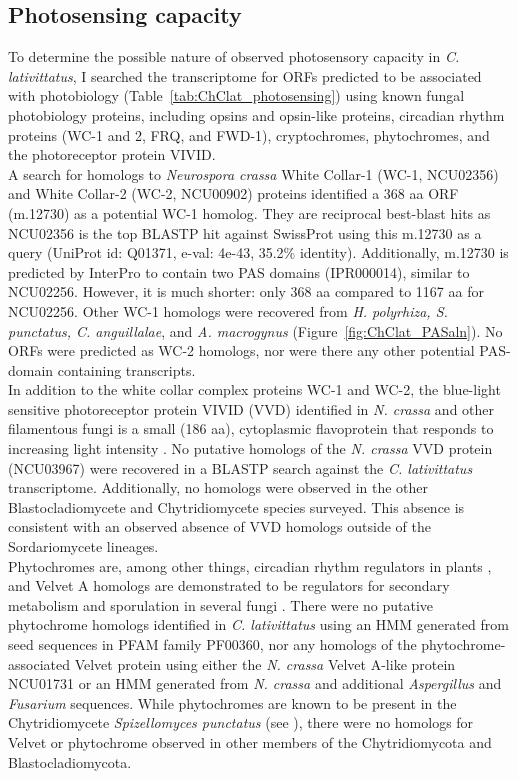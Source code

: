 \subsection*{Photosensing capacity}
To determine the possible nature of observed photosensory capacity in \textit{C. lativittatus}, I searched the transcriptome for ORFs predicted to be associated with photobiology (Table~\ref{tab:ChClat_photosensing}) using known fungal photobiology proteins, including opsins and opsin-like proteins, circadian rhythm proteins (WC-1 and 2, FRQ, and FWD-1), cryptochromes, phytochromes, and the photoreceptor protein VIVID. \\
\indent A search for homologs to \textit{Neurospora crassa} White Collar-1 (WC-1, NCU02356) and White Collar-2 (WC-2, NCU00902) proteins identified a 368 aa ORF (m.12730) as a potential WC-1 homolog. They are reciprocal best-blast hits as NCU02356 is the top BLASTP hit against SwissProt using this m.12730 as a query (UniProt id: Q01371, e-val: 4e-43, 35.2\% identity). Additionally, m.12730 is predicted by InterPro to contain two PAS domains (IPR000014), similar to NCU02256. However, it is much shorter: only 368 aa compared to 1167 aa for NCU02256. Other WC-1 homologs were recovered from \textit{H. polyrhiza, S. punctatus, C. anguillalae}, and \textit{A. macrogynus} (Figure~\ref{fig:ChClat_PASaln}). No ORFs were predicted as WC-2 homologs, nor were there any other potential PAS-domain containing transcripts. \\
\indent In addition to the white collar complex proteins WC-1 and WC-2, the blue-light sensitive photoreceptor protein VIVID (VVD) identified in \textit{N. crassa} and other filamentous fungi is a small (186 aa), cytoplasmic flavoprotein that responds to increasing light intensity \cite{Schwerdtfeger2003}. No putative homologs of the \textit{N. crassa} VVD protein (NCU03967) were recovered in a BLASTP search against the \textit{C. lativittatus} transcriptome. Additionally, no homologs were observed in the other Blastocladiomycete and Chytridiomycete species surveyed. This absence is consistent with an observed absence of VVD homologs outside of the Sordariomycete lineages.\\
\indent Phytochromes are, among other things, circadian rhythm regulators in plants \cite{Rockwell2006}, and Velvet A homologs are demonstrated to be regulators for secondary metabolism and sporulation in several fungi \cite{Calvo2008}. There were no putative phytochrome homologs identified in \textit{C. lativittatus} using an HMM generated from seed sequences in PFAM family PF00360, nor any homologs of the phytochrome-associated Velvet protein using either the \textit{N. crassa} Velvet A-like protein NCU01731 or an HMM generated from \textit{N. crassa} and additional \textit{Aspergillus} and \textit{Fusarium} sequences. While phytochromes are known to be present in the Chytridiomycete \textit{Spizellomyces punctatus} (see \cite{Idnurm2010}), there were no homologs for Velvet or phytochrome observed in other members of the Chytridiomycota and Blastocladiomycota. \\
